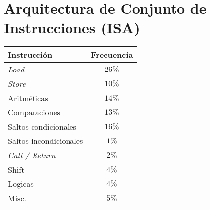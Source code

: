 \section{Arquitectura de Conjunto de Instrucciones (ISA)}
         \begin{center}
         \label{fig::232}
         \begin{tabular}{||l|c||}
         \hline
         Instrucción & Frecuencia \\\hline
         \textit{Load} & $26\%$ \\\hline
         \textit{Store} & $10\%$ \\\hline
         Aritméticas & $14\%$ \\\hline
         Comparaciones & $13\%$ \\\hline
         Saltos condicionales & $16\%$ \\\hline
         Saltos incondicionales & $1\%$ \\\hline
         \textit{Call / Return} & $2\%$ \\\hline
         Shift & $4\%$ \\\hline
         Logicas & $4\%$ \\\hline
         Misc. & $5\%$ \\\hline
         \end{tabular}
         \end{center}

